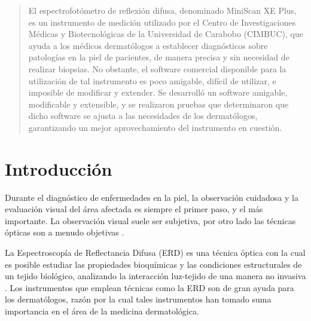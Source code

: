 \documentclass[conference]{IEEEtran}
\begin{document}
\begin{abstract}
El espectrofot\'{o}metro de reflexi\'{o}n difusa, denominado MiniScan XE Plus, es un instrumento de medici\'{o}n utilizado por el Centro de Investigaciones M\'{e}dicas y Biotecnol\'{o}gicas de la Universidad de Carabobo (CIMBUC), que ayuda a los m\'{e}dicos dermat\'{o}logos a establecer diagn\'{o}sticos sobre patolog\'{i}as en la piel de pacientes, de manera precisa y sin necesidad de realizar biopsias. No obstante, el software comercial disponible para la utilizaci\'{o}n de tal instrumento es poco amigable, dif\'{i}cil de utilizar, e imposible de modificar y extender. Se desarroll\'{o} un software amigable, modificable y extensible, y se realizaron pruebas que determinaron que dicho software se ajusta a las necesidades de los dermat\'{o}logos, garantizando un mejor aprovechamiento del instrumento en cuesti\'{o}n.
\end{abstract}





%

\section{Introducci\'{o}n}

Durante el diagn\'{o}stico de enfermedades en la piel, la observaci\'{o}n cuidadosa y la evaluaci\'{o}n visual del \'{a}rea afectada es siempre el primer paso, y el m\'{a}s importante. La observaci\'{o}n visual suele ser subjetiva, por otro lado las t\'{e}cnicas \'{o}pticas son a menudo objetivas \cite{Bersha}.

La Espectroscop\'{i}a de Reflectancia Difusa (ERD) es una t\'{e}cnica \'{o}ptica con la cual es  posible estudiar las propiedades bioqu\'{i}micas y las condiciones estructurales de un tejido biol\'{o}gico, analizando la interacci\'{o}n luz-tejido de una manera no invasiva \cite{Perez}. Los instrumentos que emplean t\'{e}cnicas como la ERD son de gran ayuda para los dermat\'{o}logos, raz\'{o}n por la cual tales instrumentos han tomado suma importancia en el \'{a}rea de la medicina dermatol\'{o}gica.
\end{document}

